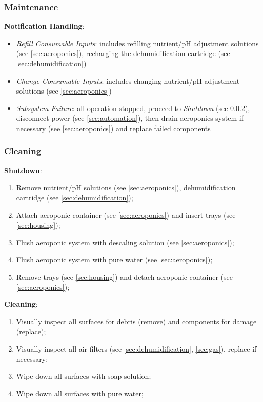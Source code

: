 \subsubsection{Maintenance}
\label{sec:process_maintenance}

\textbf{Notification Handling}:
\begin{itemize}
    \item \textit{Refill Consumable Inputs}: includes refilling nutrient/pH adjustment solutions (see \ref{sec:aeroponics}), recharging the dehumidification cartridge (see \ref{sec:dehumidification})
    \item \textit{Change Consumable Inputs}: includes changing nutrient/pH adjustment solutions (see \ref{sec:aeroponics})
    \item \textit{Subsystem Failure}: all operation stopped, proceed to \textit{Shutdown} (see \ref{sec:process_cleaning}), disconnect power (see \ref{sec:automation}), then drain aeroponics system if necessary (see \ref{sec:aeroponics}) and replace failed components
\end{itemize}

\subsubsection{Cleaning}
\label{sec:process_cleaning}

\textbf{Shutdown}:
\begin{enumerate}
    \item Remove nutrient/pH solutions (see \ref{sec:aeroponics}), dehumidification cartridge (see \ref{sec:dehumidification});
    \item Attach aeroponic container (see \ref{sec:aeroponics}) and insert trays (see \ref{sec:housing});
    \item Flush aeroponic system with descaling solution (see \ref{sec:aeroponics});
    \item Flush aeroponic system with pure water (see \ref{sec:aeroponics});
    \item Remove trays (see \ref{sec:housing}) and detach aeroponic container (see \ref{sec:aeroponics});
\end{enumerate}

\textbf{Cleaning}:
\begin{enumerate}
    \item Visually inspect all surfaces for debris (remove) and components for damage (replace);
    \item Visually inspect all air filters (see \ref{sec:dehumidification}, \ref{sec:gas}), replace if necessary;
    \item Wipe down all surfaces with soap solution;
    \item Wipe down all surfaces with pure water;
\end{enumerate}

